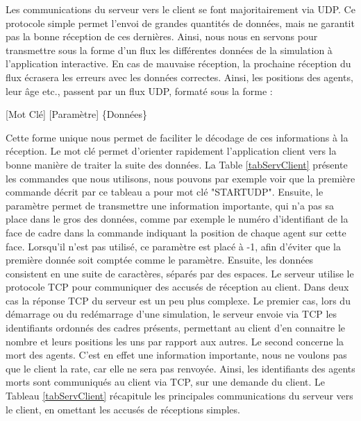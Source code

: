 	Les communications du serveur vers le client se font majoritairement via UDP. Ce protocole simple permet l'envoi de grandes quantités de données, mais ne garantit pas la bonne réception de ces dernières. Ainsi, nous nous en servons pour transmettre sous la forme d'un flux les différentes données de la simulation à l'application interactive. En cas de mauvaise réception, la prochaine réception du flux écrasera les erreurs avec les données correctes. Ainsi, les positions des agents, leur âge etc., passent par un flux UDP, formaté sous la forme :	
	\begin{center}
		[Mot Clé] [Paramètre] \{Données\}
	\end{center}
	Cette forme unique nous permet de faciliter le décodage de ces informations à la réception. Le mot clé permet d'orienter rapidement l'application client vers la bonne manière de traiter la suite des données. La Table \ref{tabServClient} présente les commandes que nous utilisons, nous pouvons par exemple voir que la première commande décrit par ce tableau a pour mot clé "STARTUDP". Ensuite, le paramètre permet de transmettre une information importante, qui n'a pas sa place dans le gros des données, comme par exemple le numéro d'identifiant de la face de cadre dans la commande indiquant la position de chaque agent sur cette face. Lorsqu'il n'est pas utilisé, ce paramètre est placé à -1, afin d'éviter que la première donnée soit comptée comme le paramètre. Ensuite, les données consistent en une suite de caractères, séparés par des espaces. 
	Le serveur utilise le protocole TCP pour communiquer des accusés de réception au client. Dans deux cas la réponse TCP du serveur est un peu plus complexe. Le premier cas, lors du démarrage ou du redémarrage d'une simulation, le serveur envoie via TCP les identifiants ordonnés des cadres présents, permettant au client d'en connaitre le nombre et leurs positions les uns par rapport aux autres. Le second concerne la mort des agents. C'est en effet une information importante, nous ne voulons pas que le client la rate, car elle ne sera pas renvoyée. Ainsi, les identifiants des agents morts sont communiqués au client via TCP, sur une demande du client. 
	Le Tableau \ref{tabServClient} récapitule les principales communications du serveur vers le client, en omettant les accusés de réceptions simples.
	
